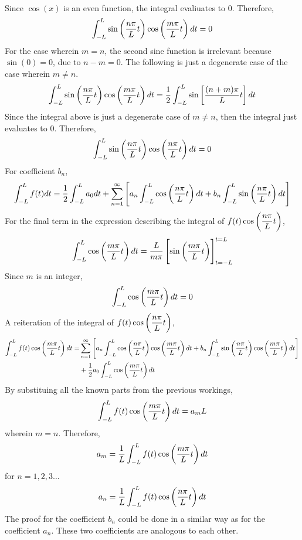 \documentclass[class=report, 12pt, crop=false]{standalone}
\begin{document}
\begin{center}
\begin{align*}
\end{align*}
Since $\cos(x)$ is an even function, the integral evaliuates to 0. Therefore,
$$\int_{-L}^{L}\sin\left(\frac{n\pi}{L}t\right)\cos\left(\frac{m\pi}{L}t\right)dt = 0$$
For the case wherein $m = n$, the second sine function is irrelevant because $\sin(0) = 0$, due to $n-m=0$. The following is just a degenerate case of the case wherein $m\neq n$.
$$\int_{-L}^{L}\sin\left(\frac{n\pi}{L}t\right)\cos\left(\frac{m\pi}{L}t\right)dt = \frac{1}{2}\int_{-L}^{L}\sin\left[\frac{(n+m)\pi}{L}t\right]dt$$
Since the integral above is just a degenerate case of $m\neq n$, then the integral just evaluates to $0$. Therefore,
$$\int_{-L}^{L}\sin\left(\frac{n\pi}{L}t\right)\cos\left(\frac{n\pi}{L}t\right)dt = 0$$
For coefficient $b_n$,
$$\int_{-L}^{L}f(t)dt = \frac{1}{2} \int_{-L}^{L}a_0dt + \sum_{n = 1}^{\infty}\left[a_n \int_{-L}^{L}\cos\left(\frac{n\pi}{L}t\right)dt + b_n \int_{-L}^{L}\sin\left(\frac{n\pi}{L}t\right)dt\right]$$
For the final term in the expression describing the integral of $\displaystyle{f(t)\cos\left(\frac{n\pi}{L}t\right)}$, 
$$\int_{-L}^{L}\cos\left(\frac{m\pi}{L}t\right)dt = \frac{L}{m\pi}\left[\sin\left(\frac{m\pi}{L}t\right)\right]^{t=L}_{t=-L}$$
Since $m$ is an integer,
$$\int_{-L}^{L}\cos\left(\frac{m\pi}{L}t\right)dt = 0$$
A reiteration of the integral of $\displaystyle{f(t)\cos\left(\frac{n\pi}{L}t\right)}$,
 \begin{align*}
\int_{-L}^{L}f(t)\cos\left(\frac{m\pi}{L}t\right)dt = &\sum_{n = 1}^{\infty}\left[a_n \int_{-L}^{L}\cos\left(\frac{n\pi}{L}t\right)\cos\left(\frac{m\pi}{L}t\right)dt + b_n \int_{-L}^{L}\sin\left(\frac{n\pi}{L}t\right)\cos\left(\frac{m\pi}{L}t\right)dt\right] \\ &+ \frac{1}{2}a_0 \int_{-L}^{L}\cos\left(\frac{m\pi}{L}t\right)dt
\end{align*}
By substituing all the known parts from the previous workings, 
$$\int_{-L}^{L}f(t)\cos\left(\frac{m\pi}{L}t\right)dt = a_m L$$
wherein $m = n$. Therefore,
$$a_m = \frac{1}{L}\int_{-L}^{L}f(t)\cos\left(\frac{m\pi}{L}t\right)dt$$
for $n=1,2,3\dots$
$$a_n = \frac{1}{L}\int_{-L}^{L}f(t)\cos\left(\frac{n\pi}{L}t\right)dt$$
The proof for the coefficient $b_n$ could be done in a similar way as for the coefficient $a_n$. These two coefficients are analogous to each other.

\end{center}
\end{document}
